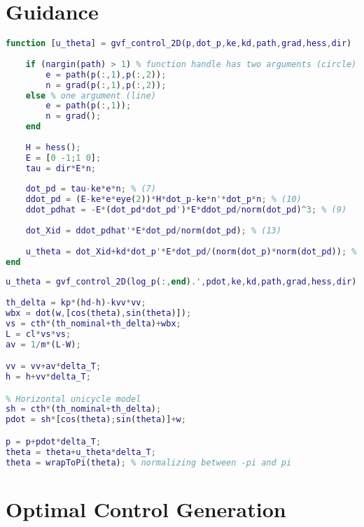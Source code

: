 \section{\color{cyan}Guidance}


\begin{lstlisting}[language=Matlab,caption={[Guidance vector field]Guidance vector field.},captionpos=b,label=lst:gvf_fun]
function [u_theta] = gvf_control_2D(p,dot_p,ke,kd,path,grad,hess,dir)
    
    if (nargin(path) > 1) % function handle has two arguments (circle)
        e = path(p(:,1),p(:,2));    
        n = grad(p(:,1),p(:,2));
    else % one argument (line)
        e = path(p(:,1));    
        n = grad();
    end
        
    H = hess();
    E = [0 -1;1 0];
    tau = dir*E*n;
    
    dot_pd = tau-ke*e*n; % (7)
    ddot_pd = (E-ke*e*eye(2))*H*dot_p-ke*n'*dot_p*n; % (10)
    ddot_pdhat = -E*(dot_pd*dot_pd')*E*ddot_pd/norm(dot_pd)^3; % (9)
    
    dot_Xid = ddot_pdhat'*E*dot_pd/norm(dot_pd); % (13)
    
    u_theta = dot_Xid+kd*dot_p'*E*dot_pd/(norm(dot_p)*norm(dot_pd)); % (16)
end
\end{lstlisting}

\begin{lstlisting}[language=Matlab,caption={[Call to the guidance function and dynamics evolution]Call to the guidance function and dynamics evolution.},captionpos=b,label=lst:gvf_call]
u_theta = gvf_control_2D(log_p(:,end).',pdot,ke,kd,path,grad,hess,dir);
        
th_delta = kp*(hd-h)-kvv*vv;
wbx = dot(w,[cos(theta),sin(theta)]);
vs = cth*(th_nominal+th_delta)+wbx;
L = cl*vs*vs;
av = 1/m*(L-W);

vv = vv+av*delta_T;
h = h+vv*delta_T;

% Horizontal unicycle model
sh = cth*(th_nominal+th_delta);
pdot = sh*[cos(theta);sin(theta)]+w;

p = p+pdot*delta_T;
theta = theta+u_theta*delta_T;  
theta = wrapToPi(theta); % normalizing between -pi and pi
\end{lstlisting}

\section{\color{cyan}Optimal Control Generation}
\label{sec:imp_opt}

